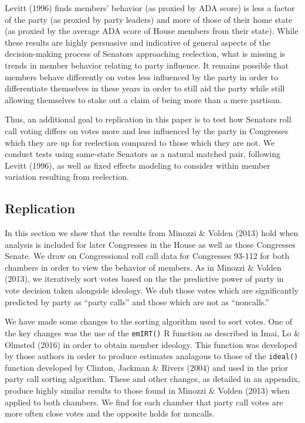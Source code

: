 \documentclass[12pt]{article}
\begin{document}
Levitt (1996) finds members' behavior (as proxied by ADA score) is less a factor of the party (as proxied by party leaders) and more of those of their home state (as proxied by the average ADA score of House members from their state). While these results are highly persuasive and indicative of general aspects of the decision-making process of Senators approaching reelection, what is missing is trends in member behavior relating to party influence. It remains possible that members behave differently on votes less influenced by the party in order to differentiate themselves in these years in order to still aid the party while still allowing themselves to stake out a claim of being more than a mere partisan.

Thus, an additional goal to replication in this paper is to test how Senators roll call voting differs on votes more and less influenced by the party in Congresses which they are up for reelection compared to those which they are not. We conduct tests using same-state Senators as a natural matched pair, following Levitt (1996), as well as fixed effects modeling to consider within member variation resulting from reelection.


\subsection{Replication}

In this section we show that the results from Minozzi \& Volden (2013) hold when analysis is included for later Congresses in the House as well as those Congresses Senate. We draw on Congressional roll call data for Congresses 93-112 for both chambers in order to view the behavior of members. As in Minozzi \& Volden (2013), we iteratively sort votes based on the the predictive power of party in vote decision taken alongside ideology. We dub those votes which are significantly predicted by party as ``party calls'' and those which are not as ``noncalls.'' 

We have made some changes to the sorting algorithm used to sort votes. One of the key changes was the use of the \verb|emIRT()| R function as described in Imai, Lo \& Olmsted (2016) in order to obtain member ideology. This function was developed by those authors in order to produce estimates analagous to those of the \verb|ideal()| function developed by Clinton, Jackman \& Rivers (2004) and used in the prior party call sorting algorithm. These and other changes, as detailed in an appendix, produce highly similar results to those found in Minozzi \& Volden (2013) when applied to both chambers. We find for each chamber that party call votes are more often close votes and the opposite holds for noncalls.
\end{document}
